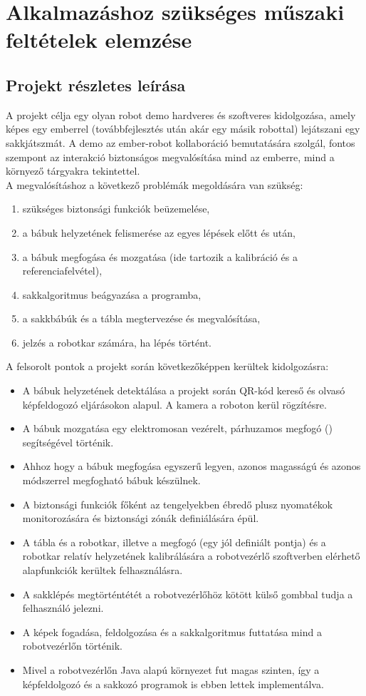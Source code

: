 \documentclass[../documentation.tex]{subfiles}
\begin{document}
\section{Alkalmazáshoz szükséges műszaki feltételek elemzése}
\subsection{Projekt részletes leírása}
A projekt célja egy olyan robot demo hardveres és szoftveres kidolgozása, amely képes egy emberrel (továbbfejlesztés után akár egy másik robottal) lejátszani egy sakkjátszmát. A demo az ember-robot kollaboráció bemutatására szolgál, fontos szempont az interakció biztonságos megvalósítása mind az emberre, mind a környező tárgyakra tekintettel.\\

A megvalósításhoz a következő problémák megoldására van szükség:
\begin{enumerate}
	\item szükséges biztonsági funkciók beüzemelése,
	\item a bábuk helyzetének felismerése az egyes lépések előtt és után,
	\item a bábuk megfogása és mozgatása (ide tartozik a kalibráció és a referenciafelvétel),
	\item sakkalgoritmus beágyazása a programba,
	\item a sakkbábúk és a tábla megtervezése és megvalósítása,
	\item jelzés a robotkar számára, ha lépés történt.
\end{enumerate}
A felsorolt pontok a projekt során következőképpen kerültek kidolgozásra:
\begin{itemize}
	\item A bábuk helyzetének detektálása a projekt során QR-kód kereső és olvasó képfeldogozó eljárásokon alapul. A kamera a roboton kerül rögzítésre.
	\item A bábuk mozgatása egy elektromosan vezérelt, párhuzamos megfogó () segítségével történik.
	\item Ahhoz hogy a bábuk megfogása egyszerű legyen, azonos magasságú és azonos módszerrel megfogható bábuk készülnek.
	\item A biztonsági funkciók főként az tengelyekben ébredő plusz nyomatékok monitorozására és biztonsági zónák definiálására épül.
	\item A tábla és a robotkar, illetve a megfogó (egy jól definiált pontja) és a robotkar relatív helyzetének kalibrálására a robotvezérlő szoftverben elérhető alapfunkciók kerültek felhasználásra.
	\item A sakklépés megtörténtétét a robotvezérlőhöz kötött külső gombbal tudja a felhasználó jelezni.
	\item A képek fogadása, feldolgozása és a sakkalgoritmus futtatása mind a robotvezérlőn történik.
	\item Mivel a robotvezérlőn Java alapú környezet fut magas szinten, így a képfeldolgozó és a sakkozó programok is ebben lettek implementálva.
\end{itemize}
\end{document}
